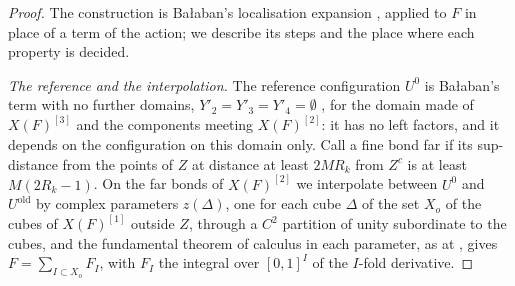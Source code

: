\documentclass[11pt]{preprint}
\numberwithin{equation}{section}
\theoremstyle{definition}
\theoremstyle{remark}
\theoremstyle{plain}
\begin{document}
\begin{proof}
The construction is Ba{\l}aban's localisation expansion \cite[p.~372, ll.~12--28; p.~373, l.~13--p.~376, l.~13]{BalabanLFR2}, applied to $F$ in place of a term of the action; we describe its steps and the place where each property is decided.

\emph{The reference and the interpolation.} The reference configuration $U^0$ is Ba{\l}aban's term with no further domains, $Y'_2 = Y'_3 = Y'_4 = \emptyset$ \cite[p.~373, ll.~31--35; p.~374, ll.~29--31]{BalabanLFR2}, for the domain made of $X(F)^{[3]}$ and the components meeting $X(F)^{[2]}$: it has no left factors, and it depends on the configuration on this domain only. Call a fine bond far if its sup-distance from the points of $Z$ at distance at least $2MR_k$ from $Z^c$ is at least $M(2R_k - 1)$. On the far bonds of $X(F)^{[2]}$ we interpolate between $U^0$ and $U^{\mathrm{old}}$ by complex parameters $z(\Delta)$, one for each cube $\Delta$ of the set $X_o$ of the cubes of $X(F)^{[1]}$ outside $Z$, through a $C^2$ partition of unity subordinate to the cubes, and the fundamental theorem of calculus in each parameter, as at \cite[(1.9)]{BalabanRG2}, gives $F = \sum_{I \subset X_o}F_I$, with $F_I$ the integral over $[0, 1]^I$ of the $I$-fold derivative.


\end{proof}
\end{document}
